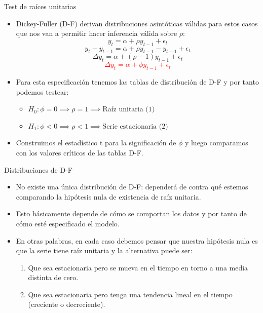 \documentclass{beamer}
\begin{document}
\begin{frame}{Test de raíces unitarias}
    \begin{itemize}
        \item Dickey-Fuller (D-F) derivan distribuciones asintóticas válidas para estos casos que nos van a permitir hacer inferencia válida sobre $\rho$:
        \[
        y_t = \alpha + \rho y_{t-1} + \epsilon_t
        \]
        \[
        y_t - y_{t-1} = \alpha + \rho y_{t-1} - y_{t-1} + \epsilon_t
        \]
        \[
        \Delta y_t = \alpha + (\rho - 1) y_{t-1} + \epsilon_t
        \]
     \textcolor{red}{   \[
        \Delta y_t = \alpha + \phi y_{t-1} + \epsilon_t
        \]}
        \item Para esta especificación tenemos las tablas de distribución de D-F y por tanto podemos testear:
        \begin{itemize}
            \item $H_0: \phi = 0 \implies \rho = 1 \implies \text{Raíz unitaria (1)}$
            \item $H_1: \phi < 0 \implies \rho < 1 \implies \text{Serie estacionaria (2)}$
        \end{itemize}
        \item Construimos el estadístico t para la significación de $\phi$ y luego comparamos con los valores críticos de las tablas D-F.
    \end{itemize}
\end{frame}
\begin{frame}{Distribuciones de D-F}
    \begin{itemize}
        \item No existe una única distribución de D-F: dependerá de contra qué estemos comparando la hipótesis nula de existencia de raíz unitaria.
        \item Esto básicamente depende de cómo se comportan los datos y por tanto de cómo esté especificado el modelo.
        \item En otras palabras, en cada caso debemos pensar que nuestra hipótesis nula es que la serie tiene raíz unitaria y la alternativa puede ser:
        \begin{enumerate}
            \item Que sea estacionaria pero se mueva en el tiempo en torno a una media distinta de cero.
            \item Que sea estacionaria pero tenga una tendencia lineal en el tiempo (creciente o decreciente).
        \end{enumerate}
    \end{itemize}
\end{frame}
\end{document}
